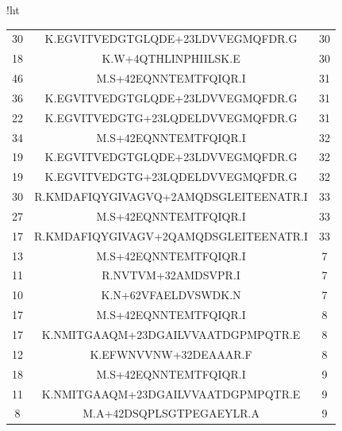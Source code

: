 \documentclass[12pt]{article}
\begin{document}
\begin{table}{!ht}
{\begin{tabular}{ccc}
30&K.EGVITVEDGTGLQDE+23LDVVEGMQFDR.G&30\\
18&K.W+4QTHLINPHIILSK.E&30\\
46&M.S+42EQNNTEMTFQIQR.I&31\\
36&K.EGVITVEDGTGLQDE+23LDVVEGMQFDR.G&31\\
22&K.EGVITVEDGTG+23LQDELDVVEGMQFDR.G&31\\
34&M.S+42EQNNTEMTFQIQR.I&32\\
19&K.EGVITVEDGTGLQDE+23LDVVEGMQFDR.G&32\\
19&K.EGVITVEDGTG+23LQDELDVVEGMQFDR.G&32\\
30&R.KMDAFIQYGIVAGVQ+2AMQDSGLEITEENATR.I&33\\
27&M.S+42EQNNTEMTFQIQR.I&33\\
17&R.KMDAFIQYGIVAGV+2QAMQDSGLEITEENATR.I&33\\
13&M.S+42EQNNTEMTFQIQR.I&7\\
11&R.NVTVM+32AMDSVPR.I&7\\
10&K.N+62VFAELDVSWDK.N&7\\
17&M.S+42EQNNTEMTFQIQR.I&8\\
17&K.NMITGAAQM+23DGAILVVAATDGPMPQTR.E&8\\
12&K.EFWNVVNW+32DEAAAR.F&8\\
18&M.S+42EQNNTEMTFQIQR.I&9\\
11&K.NMITGAAQM+23DGAILVVAATDGPMPQTR.E&9\\
8&M.A+42DSQPLSGTPEGAEYLR.A&9\\
\hline
\end{tabular}
}
\end{table}

\bigskip
\end{document}
